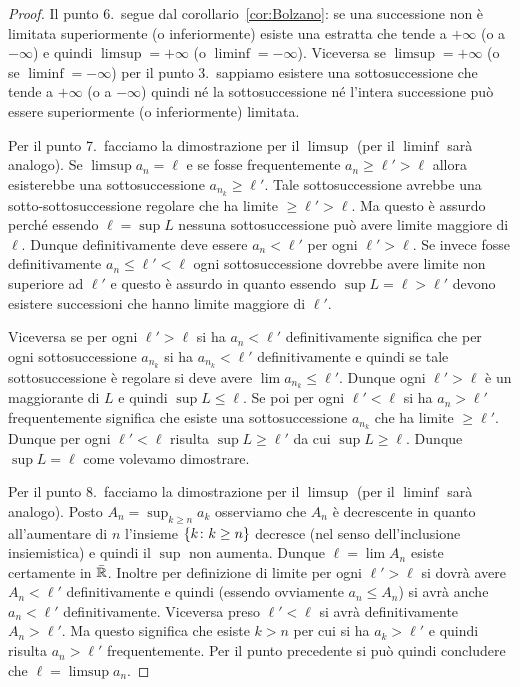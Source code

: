 \begin{proof}
  Il punto 6.\ segue dal corollario~\ref{cor:Bolzano}: se una successione
  non è limitata superiormente (o inferiormente)
  esiste una estratta che tende a $+\infty$ (o a $-\infty$) e quindi
  $\limsup  = +\infty$ (o $\liminf = -\infty$).
  Viceversa se $\limsup = +\infty$ (o se $\liminf = -\infty$)
  per il punto 3.\ sappiamo esistere
  una sottosuccessione che tende a $+\infty$ (o a $-\infty$)
  quindi né la sottosuccessione
  né l'intera successione può essere superiormente (o inferiormente) limitata.

  Per il punto 7.\ facciamo la dimostrazione per il $\limsup$ (per il $\liminf$
  sarà analogo). Se $\limsup a_n = \ell$ e se fosse frequentemente
  $a_n \ge \ell' > \ell$ allora esisterebbe una sottosuccessione $a_{n_k}\ge \ell'$.
  Tale sottosuccessione avrebbe una sotto-sottosuccessione regolare
  che ha limite $\ge \ell'> \ell$.
  Ma questo è assurdo perché essendo $\ell=\sup L$ nessuna sottosuccessione
  può avere limite maggiore di $\ell$.
  Dunque definitivamente deve essere $a_n < \ell'$ per ogni $\ell'>\ell$.
  Se invece fosse definitivamente $a_n \le \ell' < \ell$ ogni
  sottosuccessione dovrebbe avere limite non superiore ad $\ell'$
  e questo è assurdo in quanto essendo $\sup L = \ell > \ell'$
  devono esistere successioni che hanno limite maggiore di $\ell'$.

  Viceversa se per ogni $\ell'>\ell$ si ha $a_n<\ell'$ definitivamente
  significa che per ogni sottosuccessione $a_{n_k}$ si ha
  $a_{n_k} < \ell'$ definitivamente e quindi se tale sottosuccessione
  è regolare si deve avere $\lim a_{n_k} \le \ell'$. Dunque
  ogni $\ell'>\ell$ è un maggiorante di $L$ e quindi $\sup L\le \ell$.
  Se poi per ogni $\ell'<\ell$ si ha $a_n>\ell'$ frequentemente
  significa che esiste una sottosuccessione $a_{n_k}$ che
  ha limite $\ge \ell'$. Dunque per ogni $\ell'<\ell$ risulta
  $\sup L \ge \ell'$ da cui $\sup L \ge \ell$. Dunque $\sup L=\ell$
  come volevamo dimostrare.

  Per il punto 8.\ facciamo la dimostrazione per il $\limsup$ (per il $\liminf$
  sarà analogo).
  Posto $A_n = \sup_{k\ge n} a_k$ osserviamo che $A_n$ è decrescente
  in quanto all'aumentare di $n$ l'insieme
  ${\left\{ k\colon k \ge n \right\}}$ decresce (nel senso dell'inclusione insiemistica)
  e quindi
  il $\sup$ non aumenta.
  Dunque $\ell=\lim A_n$ esiste certamente in $\bar {\mathbb R}$.
  Inoltre per definizione di limite per ogni $\ell'>\ell$
  si dovrà avere $A_n < \ell'$ definitivamente e quindi
  (essendo ovviamente $a_n \le A_n$) si avrà
  anche $a_n < \ell'$ definitivamente.
  Viceversa preso $\ell'<\ell$ si avrà definitivamente
  $A_n > \ell'$. Ma questo significa che esiste $k>n$
  per cui si ha $a_k > \ell'$ e quindi
  risulta $a_n > \ell'$ frequentemente.
  Per il punto precedente si può quindi concludere che
  $\ell = \limsup a_n$.
\end{proof}

